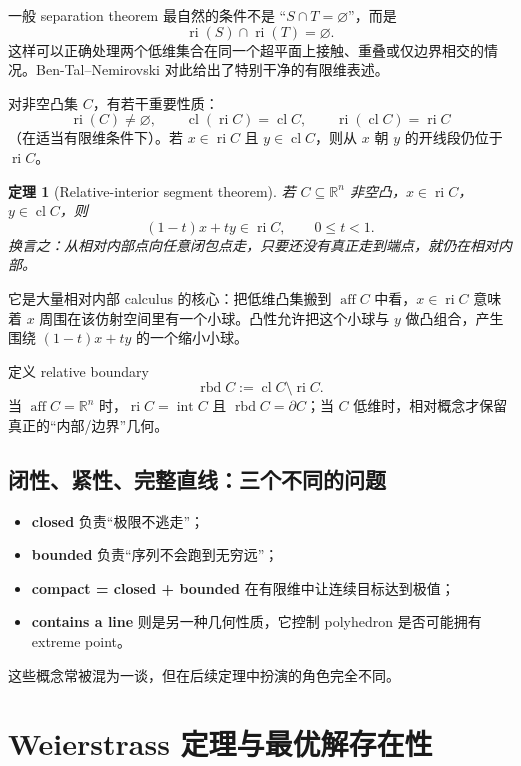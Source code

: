 \documentclass[11pt,a4paper,openany]{ctexrep}
\newtheorem{theorem}{定理}[chapter]
\theoremstyle{definition}
\newcommand{\R}{\mathbb{R}}
\newcommand{\cl}{\operatorname{cl}}
\newcommand{\interior}{\operatorname{int}}
\newcommand{\ri}{\operatorname{ri}}
\newcommand{\aff}{\operatorname{aff}}
\newcommand{\rbd}{\operatorname{rbd}}
\begin{document}
\begin{keybox}[为什么相对内部非常重要？]
一般 separation theorem 最自然的条件不是 ``$S\cap T=\varnothing$''，而是
\[
\ri(S)\cap\ri(T)=\varnothing.
\]
这样可以正确处理两个低维集合在同一个超平面上接触、重叠或仅边界相交的情况。Ben-Tal--Nemirovski 对此给出了特别干净的有限维表述。\cite[Appendix~B.1.6, B.2.6]{bental}
\end{keybox}

对非空凸集 $C$，有若干重要性质：
\[
\ri(C)\ne\varnothing,
\qquad
\cl(\ri C)=\cl C,
\qquad
\ri(\cl C)=\ri C
\]
（在适当有限维条件下）。若 $x\in\ri C$ 且 $y\in\cl C$，则从 $x$ 朝 $y$ 的开线段仍位于 $\ri C$。


\begin{theorem}[Relative-interior segment theorem]
若 $C\subseteq\R^n$ 非空凸，$x\in\ri C$，$y\in\cl C$，则
\[
(1-t)x+ty\in\ri C,\qquad 0\le t<1.
\]
换言之：从相对内部点向任意闭包点走，只要还没有真正走到端点，就仍在相对内部。
\end{theorem}

\begin{proofmap}[为什么这条结果值得掌握？]
它是大量相对内部 calculus 的核心：把低维凸集搬到 $\aff C$ 中看，$x\in\ri C$ 意味着 $x$ 周围在该仿射空间里有一个小球。凸性允许把这个小球与 $y$ 做凸组合，产生围绕 $(1-t)x+ty$ 的一个缩小小球。
\end{proofmap}

定义 relative boundary
\[
\rbd C:=\cl C\setminus\ri C.
\]
当 $\aff C=\R^n$ 时，$\ri C=\interior C$ 且 $\rbd C=\partial C$；当 $C$ 低维时，相对概念才保留真正的“内部/边界”几何。

\section{闭性、紧性、完整直线：三个不同的问题}
\begin{itemize}[leftmargin=2em]
  \item \textbf{closed} 负责“极限不逃走”；
  \item \textbf{bounded} 负责“序列不会跑到无穷远”；
  \item \textbf{compact = closed + bounded} 在有限维中让连续目标达到极值；
  \item \textbf{contains a line} 则是另一种几何性质，它控制 polyhedron 是否可能拥有 extreme point。
\end{itemize}
这些概念常被混为一谈，但在后续定理中扮演的角色完全不同。

\chapter{Weierstrass 定理与最优解存在性}
\end{document}
